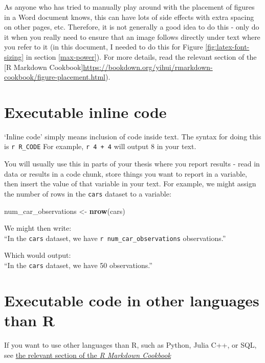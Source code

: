 \documentclass[a4paper,nobind]{templates/ociamthesis}
\newenvironment{Shaded}{\begin{snugshade}}{\end{snugshade}}
\newcommand{\KeywordTok}[1]{\textcolor[rgb]{0.13,0.29,0.53}{\textbf{#1}}}
\newcommand{\NormalTok}[1]{#1}
\newcommand{\StringTok}[1]{\textcolor[rgb]{0.31,0.60,0.02}{#1}}
\renewenvironment{Shaded}
{
  \vspace{10pt}%
  \begin{snugshade}%
}{%
  \end{snugshade}%
  \vspace{8pt}%
}
\begin{document}
As anyone who has tried to manually play around with the placement of
figures in a Word document knows, this can have lots of side effects
with extra spacing on other pages, etc. Therefore, it is not generally a
good idea to do this - only do it when you really need to ensure that an
image follows directly under text where you refer to it (in this
document, I needed to do this for Figure \ref{fig:latex-font-sizing} in
section \ref{max-power}). For more details, read the relevant section of
the {[}R Markdown
Cookbook{]}\url{https://bookdown.org/yihui/rmarkdown-cookbook/figure-placement.html}).

\section{Executable inline code}\label{executable-inline-code}

`Inline code' simply means inclusion of code inside text. The syntax for
doing this is \texttt{\textasciigrave{}r\ R\_CODE\textasciigrave{}} For
example, \texttt{\textasciigrave{}r\ 4\ +\ 4\textasciigrave{}} will
output 8 in your text.

You will usually use this in parts of your thesis where you report
results - read in data or results in a code chunk, store things you want
to report in a variable, then insert the value of that variable in your
text. For example, we might assign the number of rows in the
\texttt{cars} dataset to a variable:

\begin{Shaded}
\begin{Highlighting}[]
\NormalTok{num_car_observations <-}\StringTok{ }\KeywordTok{nrow}\NormalTok{(cars)}
\end{Highlighting}
\end{Shaded}

We might then write:\\
``In the \texttt{cars} dataset, we have
\texttt{\textasciigrave{}r\ num\_car\_observations\textasciigrave{}}
observations.''

Which would output:\\
``In the \texttt{cars} dataset, we have 50 observations.''

\section{Executable code in other languages than
R}\label{executable-code-in-other-languages-than-r}

If you want to use other languages than R, such as Python, Julia C++, or
SQL, see
\href{https://bookdown.org/yihui/rmarkdown-cookbook/other-languages.html}{the
relevant section of the \emph{R Markdown Cookbook}}
\end{document}
